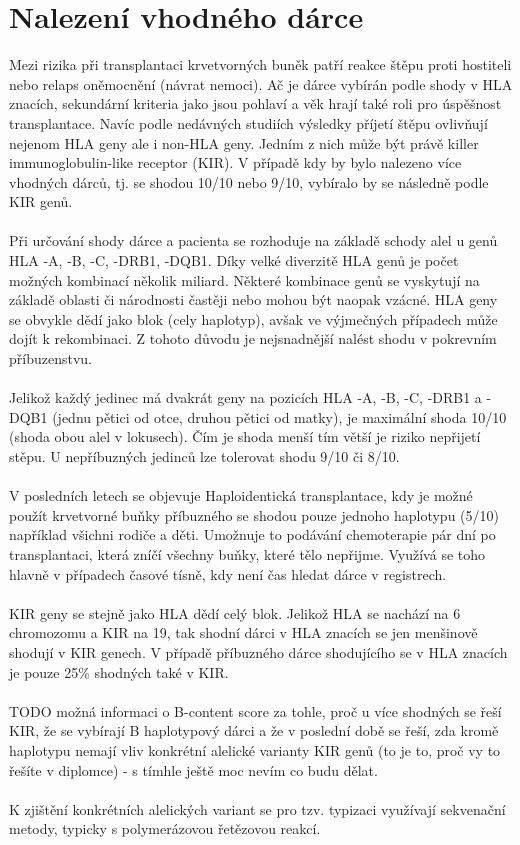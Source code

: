 \documentclass[czech,DP]{thesiskiv}
\numberwithin{equation}{section}
\begin{document}
\section{Nalezení vhodného dárce}
Mezi rizika při transplantaci krvetvorných buněk patří reakce štěpu proti hostiteli nebo relaps oněmocnění (návrat nemoci). Ač je dárce vybírán podle shody v HLA znacích, sekundární kriteria jako jsou pohlaví a věk hrají také roli pro úspěšnost transplantace. Navíc podle nedávných studiích výsledky příjetí štěpu ovlivňují nejenom HLA geny ale i non-HLA geny. Jedním z nich může být právě killer immunoglobulin-like receptor (KIR). V případě kdy by bylo nalezeno více vhodných dárců, tj. se shodou 10/10 nebo 9/10, vybíralo by se následně podle KIR genů. \cite{KIR_transplantace_jindra} \cite{Frycova_bakalarka}
\\
\\
Při určování shody dárce a pacienta se rozhoduje na základě schody alel u genů HLA -A, -B, -C, -DRB1, -DQB1. Díky velké diverzitě HLA genů je počet možných kombinací několik miliard. Některé kombinace genů se vyskytují na základě oblasti či národnosti častěji nebo mohou být naopak vzácné. HLA geny se obvykle dědí jako blok (cely haplotyp), avšak ve výjmečných případech může dojít k rekombinaci. Z tohoto důvodu je nejsnadnější nalést shodu v pokrevním příbuzenstvu.
\\
\\
Jelikož každý jedinec má dvakrát geny na pozicích HLA -A, -B, -C, -DRB1 a -DQB1 (jednu pětici od otce, druhou pětici od matky), je maximální shoda 10/10 (shoda obou alel v lokusech). Čím je shoda menší tím větší je riziko nepřijetí stěpu. U nepříbuzných jedinců lze tolerovat shodu 9/10 či 8/10. \cite{Frycova_bakalarka} \cite{KIR_transplantace_jindra}
\\
\\
V posledních letech se objevuje Haploidentická transplantace, kdy je možné použít krvetvorné buňky příbuzného se shodou pouze jednoho haplotypu (5/10) například všichni rodiče a děti. Umožnuje to podávání chemoterapie pár dní po transplantaci, která zníčí všechny buňky, které tělo nepřijme. Využívá se toho hlavně v případech časové tísně, kdy není čas hledat dárce v registrech. \cite{haploidenticka_transplantace}
\\
\\
KIR geny se stejně jako HLA dědí celý blok. Jelikož HLA se nachází na 6 chromozomu a KIR na 19, tak shodní dárci v HLA znacích se jen menšinově shodují v KIR genech. V případě příbuzného dárce shodujícího se v HLA znacích je pouze 25\% shodných také v KIR. \cite{KIR_haplotypy}
\\
\\
TODO možná informaci o B-content score za tohle, proč u více shodných se řeší KIR, že se vybírají B haplotypový dárci a že v poslední době se řeší, zda kromě haplotypu nemají vliv konkrétní alelické varianty KIR genů (to je to, proč vy to řešíte v diplomce) - s tímhle ještě moc nevím co budu dělat.
\\
\\
K zjištění konkrétních alelických variant se pro tzv. typizaci využívají sekvenační metody, typicky s polymerázovou řetězovou reakcí. 
\end{document}
